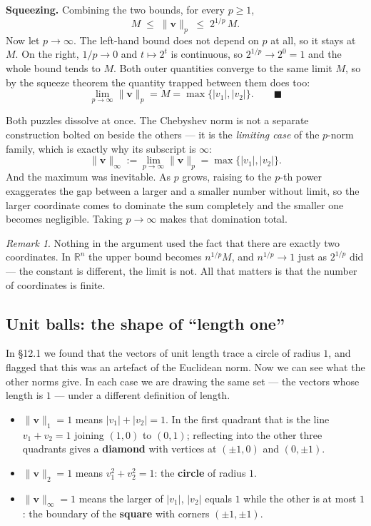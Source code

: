 \documentclass[11pt]{article}
\theoremstyle{definition}
\theoremstyle{remark}
\newtheorem*{rmk}{Remark}
\newcommand{\R}{\mathbb{R}}
\newcommand{\vc}[1]{\mathbf{#1}}
\newcommand{\norm}[1]{\lVert #1\rVert}
\begin{document}
\smallskip
\noindent\textbf{Squeezing.} Combining the two bounds, for every $p\ge1$,
\[
  M \;\le\; \norm{\vc{v}}_p \;\le\; 2^{1/p}\,M .
\]
Now let $p\to\infty$. The left-hand bound does not depend on $p$ at all, so it
stays at $M$. On the right, $1/p\to0$ and $t\mapsto 2^{t}$ is continuous, so
$2^{1/p}\to 2^{0}=1$ and the whole bound tends to $M$. Both outer quantities
converge to the same limit $M$, so by the squeeze theorem the quantity trapped
between them does too:
\[
  \lim_{p\to\infty}\norm{\vc{v}}_p = M
  = \max\bigl\{\lvert v_1\rvert,\lvert v_2\rvert\bigr\}. \qquad\blacksquare
\]

\noindent Both puzzles dissolve at once. The Chebyshev norm is not a separate
construction bolted on beside the others --- it is the \emph{limiting case} of
the $p$-norm family, which is exactly why its subscript is $\infty$:
\[
  \norm{\vc{v}}_\infty := \lim_{p\to\infty}\norm{\vc{v}}_p
  = \max\bigl\{\lvert v_1\rvert,\lvert v_2\rvert\bigr\}.
\]
And the maximum was inevitable. As $p$ grows, raising to the $p$-th power
exaggerates the gap between a larger and a smaller number without limit, so the
larger coordinate comes to dominate the sum completely and the smaller one
becomes negligible. Taking $p\to\infty$ makes that domination total.

\begin{rmk}
Nothing in the argument used the fact that there are exactly two coordinates.
In $\R^{n}$ the upper bound becomes $n^{1/p}M$, and $n^{1/p}\to1$ just as
$2^{1/p}$ did --- the constant is different, the limit is not. All that matters
is that the number of coordinates is finite.
\end{rmk}

\subsection{Unit balls: the shape of ``length one''}
In \S12.1 we found that the vectors of unit length trace a circle of radius $1$,
and flagged that this was an artefact of the Euclidean norm. Now we can see what
the other norms give. In each case we are drawing the same set --- the vectors
whose length is $1$ --- under a different definition of length.

\begin{itemize}[leftmargin=1.4em,itemsep=4pt]
  \item $\norm{\vc{v}}_1=1$ means $\lvert v_1\rvert+\lvert v_2\rvert=1$. In the
        first quadrant that is the line $v_1+v_2=1$ joining $(1,0)$ to $(0,1)$;
        reflecting into the other three quadrants gives a \textbf{diamond} with
        vertices at $(\pm1,0)$ and $(0,\pm1)$.
  \item $\norm{\vc{v}}_2=1$ means $v_1^{2}+v_2^{2}=1$: the \textbf{circle} of
        radius $1$.
  \item $\norm{\vc{v}}_\infty=1$ means the larger of $\lvert v_1\rvert$,
        $\lvert v_2\rvert$ equals $1$ while the other is at most $1$: the
        boundary of the \textbf{square} with corners $(\pm1,\pm1)$.
\end{itemize}
\end{document}
